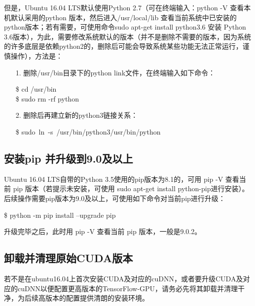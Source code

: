 \documentclass[11pt,a4paper]{ctexart}
\begin{document}
但是，Ubuntu 16.04 LTS默认使用Python 2.7（可在终端输入：python -V 查看本机默认采用的python 版本，然后进入/usr/local/lib 查看当前系统中已安装的python版本；若有需要，可使用命令sudo apt-get install python3.6 安装 Python 3.6版本），为此，需要修改系统默认的版本（并不是删除不需要的版本，因为系统的许多底层是依赖python2的，删除后可能会导致系统某些功能无法正常运行，谨慎操作），方法是：
\begin{itemize}
\item[1.] 删除/usr/bin目录下的python link文件，在终端输入如下命令：
\vspace{-0.3cm}
\begin{center}
\$ cd /usr/bin \\
\$ sudo rm -rf python
\end{center}

\item[2.] 删除后再建立新的python3链接关系：
\vspace{-0.3cm}
\begin{center}
\$ sudo\ ln\ -s\ /usr/bin/python3\quad   /usr/bin/python
\end{center}
\end{itemize}


\subsection{安装pip 并升级到9.0及以上}
Ubuntu 16.04 LTS自带的Python 3.5使用的pip版本为8.1的，可用 pip -V 查看当前 pip 版本（若提示未安装，可使用 sudo apt-get install python-pip进行安装）。后续操作需要pip版本为9.0及以上，可使用如下命令对当前pip进行升级：
\vspace{-0.3cm}
\begin{center}
\$ python -m pip install --upgrade pip
\end{center}
升级完毕之后，此时用 pip -V 查看当前 pip 版本，一般是9.0.2。

\subsection{卸载并清理原始CUDA版本}
若不是在ubuntu16.04上首次安装CUDA及对应的cuDNN，或者要升级CUDA及对应的cuDNN以便配置更高版本的TensorFlow-GPU，请务必先将其卸载并清理干净，为后续高版本的配置提供清朗的安装环境。
\end{document}
